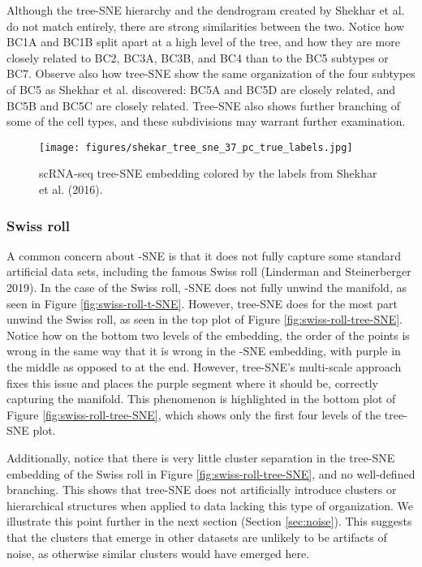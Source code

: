 \documentclass{article}
\begin{document}
Although the tree-SNE hierarchy and the dendrogram created by Shekhar et al. do not match entirely, there are strong similarities between the two. Notice how BC1A and BC1B split apart at a high level of the tree, and how they are more closely related to BC2, BC3A, BC3B, and BC4 than to the BC5 subtypes or BC7. Observe also how tree-SNE show the same organization of the four subtypes of BC5 as Shekhar et al. discovered: BC5A and BC5D are closely related, and BC5B and BC5C are closely related. Tree-SNE also shows further branching of some of the cell types, and these subdivisions may warrant further examination.

\begin{figure}[htp]
    \centering
    \captionsetup{width=.9\linewidth}
    \texttt{[image: figures/shekar\_tree\_sne\_37\_pc\_true\_labels.jpg]}
    \caption{scRNA-seq tree-SNE embedding colored by the labels from Shekhar et al. (2016).}
    \label{fig:scRNA-seq-tree-SNE}
\end{figure}

\subsubsection{Swiss roll}

A common concern about -SNE is that it does not fully capture some standard artificial data sets, including the famous Swiss roll (Linderman and Steinerberger 2019). In the case of the Swiss roll, -SNE does not fully unwind the manifold, as seen in Figure \ref{fig:swiss-roll-t-SNE}. However, tree-SNE does for the most part unwind the Swiss roll, as seen in the top plot of Figure \ref{fig:swiss-roll-tree-SNE}. Notice how on the bottom two levels of the embedding, the order of the points is wrong in the same way that it is wrong in the -SNE embedding, with purple in the middle as opposed to at the end. However, tree-SNE's multi-scale approach fixes this issue and places the purple segment where it should be, correctly capturing the manifold. This phenomenon is highlighted in the bottom plot of Figure \ref{fig:swiss-roll-tree-SNE}, which shows only the first four levels of the tree-SNE plot.

Additionally, notice that there is very little cluster separation in the tree-SNE embedding of the Swiss roll in Figure \ref{fig:swiss-roll-tree-SNE}, and no well-defined branching. This shows that tree-SNE does not artificially introduce clusters or hierarchical structures when applied to data lacking this type of organization. We illustrate this point further in the next section (Section \ref {sec:noise}). This suggests that the clusters that emerge in other datasets are unlikely to be artifacts of noise, as otherwise similar clusters would have emerged here.
\end{document}

